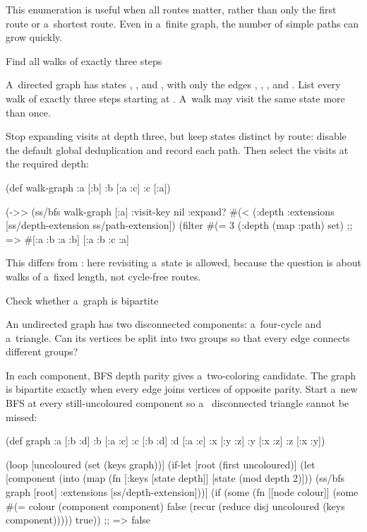 {This enumeration is useful when all routes matter, rather than only the
first route or a~shortest route. Even in a~finite graph, the number of
simple paths can grow quickly.

\secc Find all walks of exactly three steps

 A~directed graph has states , ,
and , with only the edges , ,
, and . List every walk of exactly three
steps starting at . A~walk may visit the same state more than once.

\smallskip
{} Stop expanding visits at depth three, but keep
states distinct by route: disable the default global 
deduplication and record each path. Then select the visits at the required
depth:

\begtt {}
(def walk-graph
  {:a [:b]
   :b [:a :c]
   :c [:a]})

(->> (ss/bfs walk-graph [:a]
                 {:visit-key nil
                  :expand? #(< (:depth %
                  :extensions [ss/depth-extension
                               ss/path-extension]})
     (filter #(= 3 (:depth %
     (map :path)
     set)
;; => #{[:a :b :a :b] [:a :b :c :a]}
\endtt

This differs from : here revisiting a~state is allowed,
because the question is about walks of a~fixed length, not cycle-free routes.

\secc Check whether a~graph is bipartite

 An undirected graph has two disconnected components:
a~four-cycle and a~triangle. Can its vertices be split into two groups so
that every edge connects different groups?

\smallskip
{} In each component, BFS depth parity gives a~two-coloring
candidate. The graph is bipartite exactly when every edge joins vertices of
opposite parity. Start a~new BFS at every still-uncoloured component so a~
disconnected triangle cannot be missed:

\begtt {}
(def graph
  {:a [:b :d] :b [:a :c] :c [:b :d] :d [:a :c]
   :x [:y :z] :y [:x :z] :z [:x :y]})

(loop [uncoloured (set (keys graph))]
  (if-let [root (first uncoloured)]
    (let [component
          (into {} (map (fn [{:keys [state depth]}]
                          [state (mod depth 2)]))
                (ss/bfs graph [root]
                            {:extensions [ss/depth-extension]}))]
      (if (some (fn [[node colour]]
                  (some #(= colour (component %
                component)
        false
        (recur (reduce disj uncoloured (keys component)))))
    true))
;; => false
\endtt

}
